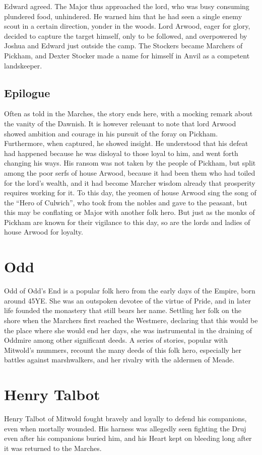 Edward
agreed. The Major thus
approached the lord, who was busy
consuming plundered food,
unhindered. He warned him that he
had seen a single enemy scout in a
certain direction, yonder in the
woods. Lord Arwood, eager for glory,
decided to capture the target himself,
only to be followed, and
overpowered by Joshua and Edward
just outside the camp. The Stockers became Marchers of Pickham, and Dexter Stocker made a name for himself in Anvil as a competent landskeeper.

\subsection{Epilogue}
Often as told in the
Marches, the story ends
here, with a mocking
remark about the vanity of the
Dawnish. It is however
releuant to note that lord Arwood
showed ambition and courage in his
pursuit of the foray on Pickham.
Furthermore, when captured, he
showed insight. He understood that
his defeat had happened because he
was disloyal to those loyal to him,
and went forth changing his ways.
His ransom was not taken by the
people of Pickham, but split among
the poor serfs of house Arwood,
because it had been them who had
toiled for the lord's wealth, and it
had become Marcher wisdom already
that prosperity requires working for
it. To this day, the yeomen of house Arwood
sing the song of the “Hero of
Culwich”, who took from the nobles
and gave to the peasant, but this
may be conflating or Major with
another folk hero. But just as the
monks of Pickham are known for
their vigilance to this day, so are the
lords and ladies of house Arwood for
loyalty.
\section{Odd}
Odd of Odd's End is a popular folk hero from the early days of the Empire, born around 45YE. She was an outspoken devotee of the virtue of Pride, and in later life founded the monastery that still bears her name. Settling her folk on the shore when the Marchers first reached the Westmere, declaring that this would be the place where she would end her days, she was instrumental in the draining of Oddmire among other significant deeds. A series of stories, popular with Mitwold's mummers, recount the many deeds of this folk hero, especially her battles against marshwalkers, and her rivalry with the aldermen of Meade.

\section{Henry Talbot}
Henry Talbot of Mitwold fought bravely and loyally to defend his companions, even when mortally wounded. His harness was allegedly seen fighting the Druj even after his companions buried him, and his Heart kept on bleeding long after it was returned to the Marches.
